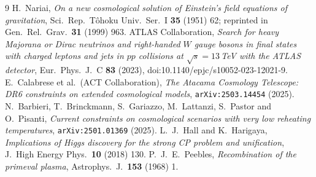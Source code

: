 \documentclass[11pt,a4paper]{article}
\theoremstyle{plain}
\theoremstyle{definition}
\theoremstyle{remark}
\begin{document}
\begin{thebibliography}{9}
 H.~Nariai, \emph{On a new cosmological solution of Einstein's field equations of gravitation}, Sci.\ Rep.\ T\^ohoku Univ.\ Ser.\ I \textbf{35} (1951) 62; reprinted in Gen.\ Rel.\ Grav.\ \textbf{31} (1999) 963.
 ATLAS Collaboration, \emph{Search for heavy Majorana or Dirac neutrinos and right-handed $W$ gauge bosons in final states with charged leptons and jets in $pp$ collisions at $\sqrt{s}=13$\,TeV with the ATLAS detector}, Eur.\ Phys.\ J.\ C \textbf{83} (2023), doi:10.1140/epjc/s10052-023-12021-9.
 E.~Calabrese et al.\ (ACT Collaboration), \emph{The Atacama Cosmology Telescope: DR6 constraints on extended cosmological models}, \texttt{arXiv:2503.14454} (2025).
 N.~Barbieri, T.~Brinckmann, S.~Gariazzo, M.~Lattanzi, S.~Pastor and O.~Pisanti, \emph{Current constraints on cosmological scenarios with very low reheating temperatures}, \texttt{arXiv:2501.01369} (2025).
 L.~J.~Hall and K.~Harigaya, \emph{Implications of Higgs discovery for the strong CP problem and unification}, J.\ High Energy Phys.\ \textbf{10} (2018) 130.
P.~J.~E.~Peebles,
\emph{Recombination of the primeval plasma},
Astrophys.~J.~\textbf{153} (1968) 1.
\end{thebibliography}
\end{document}
